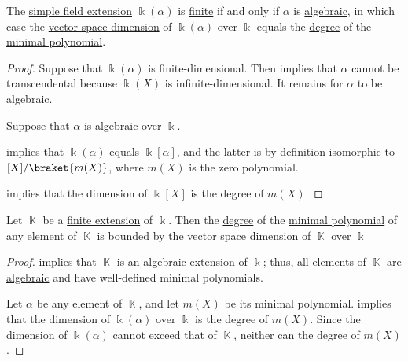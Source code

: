 \begin{proposition}\label{thm:simple_extension_degree}
  The \hyperref[def:simple_field_extension]{simple field extension} \( \Bbbk(\alpha) \) is \hyperref[def:field_extension_degree]{finite} if and only if \( \alpha \) is \hyperref[def:algebraic_element]{algebraic}, in which case the \hyperref[def:vector_space_dimension]{vector space dimension} of \( \Bbbk(\alpha) \) over \( \Bbbk \) equals the \hyperref[def:polynomial_degree]{degree} of the \hyperref[def:algebraic_element_minimal_polynomial]{minimal polynomial}.
\end{proposition}
\begin{proof}
  \SufficiencySubProof Suppose that \( \Bbbk(\alpha) \) is finite-dimensional. Then  implies that \( \alpha \) cannot be transcendental because \( \Bbbk(X) \) is infinite-dimensional. It remains for \( \alpha \) to be algebraic.

  \NecessitySubProof Suppose that \( \alpha \) is algebraic over \( \Bbbk \).

   implies that \( \Bbbk(\alpha) \) equals \( \Bbbk[\alpha] \), and the latter is by definition isomorphic to \( \Bbbk[X] / \braket{ m(X) } \), where \( m(X) \) is the zero polynomial.

   implies that the dimension of \( \Bbbk[X] \) is the degree of \( m(X) \).
\end{proof}

\begin{corollary}\label{thm:finite_extension_degree_bound}
  Let \( \BbbK \) be a \hyperref[thm:finite_field_extensions_are_algebraic]{finite extension} of \( \Bbbk \). Then the \hyperref[def:polynomial_degree]{degree} of the \hyperref[def:algebraic_element_minimal_polynomial]{minimal polynomial} of any element of \( \BbbK \) is bounded by the \hyperref[def:vector_space_dimension]{vector space dimension} of \( \BbbK \) over \( \Bbbk \)
\end{corollary}
\begin{proof}
   implies that \( \BbbK \) is an \hyperref[def:algebraic_extension]{algebraic extension} of \( \Bbbk \); thus, all elements of \( \BbbK \) are \hyperref[def:algebraic_element]{algebraic} and have well-defined minimal polynomials.

  Let \( \alpha \) be any element of \( \BbbK \), and let \( m(X) \) be its minimal polynomial.  implies that the dimension of \( \Bbbk(\alpha) \) over \( \Bbbk \) is the degree of \( m(X) \). Since the dimension of \( \Bbbk(\alpha) \) cannot exceed that of \( \BbbK \), neither can the degree of \( m(X) \).
\end{proof}

